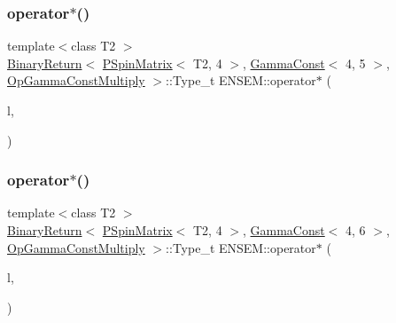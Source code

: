\subsubsection{\texorpdfstring{operator$\ast$()}{operator*()}\hspace{0.1cm}{\footnotesize\ttfamily [22/64]}}
{\footnotesize\ttfamily template$<$class T2 $>$ \\
\mbox{\hyperlink{structENSEM_1_1BinaryReturn}{Binary\+Return}}$<$ \mbox{\hyperlink{classENSEM_1_1PSpinMatrix}{P\+Spin\+Matrix}}$<$ T2, 4 $>$, \mbox{\hyperlink{classENSEM_1_1GammaConst}{Gamma\+Const}}$<$ 4, 5 $>$, \mbox{\hyperlink{structENSEM_1_1OpGammaConstMultiply}{Op\+Gamma\+Const\+Multiply}} $>$\+::Type\+\_\+t E\+N\+S\+E\+M\+::operator$\ast$ (\begin{DoxyParamCaption}\item[{const \mbox{\hyperlink{classENSEM_1_1PSpinMatrix}{P\+Spin\+Matrix}}$<$ T2, 4 $>$ \&}]{l,  }\item[{const \mbox{\hyperlink{classENSEM_1_1GammaConst}{Gamma\+Const}}$<$ 4, 5 $>$ \&}]{ }\end{DoxyParamCaption})\hspace{0.3cm}{\ttfamily [inline]}}

\mbox{\label{group__primspinmatrix_gaf04b1dbd5214d0a0e3a846a865a23f0e}} 
\subsubsection{\texorpdfstring{operator$\ast$()}{operator*()}\hspace{0.1cm}{\footnotesize\ttfamily [23/64]}}
{\footnotesize\ttfamily template$<$class T2 $>$ \\
\mbox{\hyperlink{structENSEM_1_1BinaryReturn}{Binary\+Return}}$<$ \mbox{\hyperlink{classENSEM_1_1PSpinMatrix}{P\+Spin\+Matrix}}$<$ T2, 4 $>$, \mbox{\hyperlink{classENSEM_1_1GammaConst}{Gamma\+Const}}$<$ 4, 6 $>$, \mbox{\hyperlink{structENSEM_1_1OpGammaConstMultiply}{Op\+Gamma\+Const\+Multiply}} $>$\+::Type\+\_\+t E\+N\+S\+E\+M\+::operator$\ast$ (\begin{DoxyParamCaption}\item[{const \mbox{\hyperlink{classENSEM_1_1PSpinMatrix}{P\+Spin\+Matrix}}$<$ T2, 4 $>$ \&}]{l,  }\item[{const \mbox{\hyperlink{classENSEM_1_1GammaConst}{Gamma\+Const}}$<$ 4, 6 $>$ \&}]{ }\end{DoxyParamCaption})\hspace{0.3cm}{\ttfamily [inline]}}

